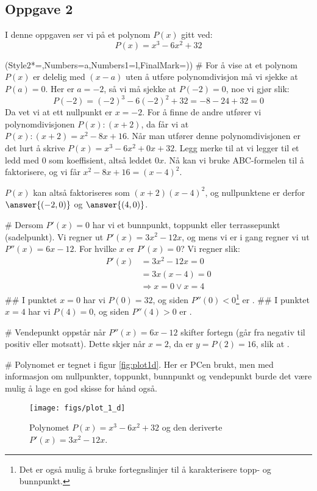 \subsection*{Oppgave 2}
I denne oppgaven ser vi på et polynom $P(x)$ gitt ved:
\begin{equation*}
	P(x) = x^3 - 6x^2 + 32
\end{equation*}
\begin{easylist}[enumerate]
	\ListProperties(Style2*=,Numbers=a,Numbers1=l,FinalMark={)})
	# For å vise at et polynom $P(x)$ er delelig med $(x-a)$ uten å utføre polynomdivisjon må vi sjekke at $P(a) = 0$. Her er $a = -2$, så vi må sjekke at $P(-2) = 0$, noe vi gjør slik: 
	\begin{equation*}
		P(-2) = (-2)^3 - 6(-2)^2 + 32 = -8 - 24 + 32 = 0
	\end{equation*}
	Da vet vi at ett nullpunkt er $x = -2$. For å finne de andre utfører vi polynomdivisjonen $P(x):(x+2)$, da får vi at $P(x):(x+2) = x^2 -8x +16$. Når man utfører denne polynomdivisjonen er det lurt å skrive $P(x) = x^3 - 6x^2 + 0x + 32$. Legg merke til at vi legger til et ledd med $0$ som koeffisient, altså leddet $0x$. Nå kan vi bruke ABC-formelen til å faktorisere, og vi får $x^2 -8x +16 = (x-4)^2$.
	
	$P(x)$ kan altså faktoriseres som $(x+2)(x-4)^2$, og nullpunktene er derfor $\answer{(-2, 0)}$ og $\answer{(4, 0)}$.
	
	# Dersom $P'(x) = 0$ har vi et bunnpunkt, toppunkt eller terrassepunkt (sadelpunkt). Vi regner ut $P'(x) = 3x^2- 12x$, og mens vi er i gang regner vi ut $P''(x) = 6x - 12$. For hvilke $x$ er $P'(x) = 0$? Vi regner slik:
	\begin{align*}
		P'(x) &= 3x^2- 12x = 0 \\
		&= 3x(x-4) = 0 \\
		&\Rightarrow x = 0 \vee x = 4
	\end{align*}
	## I punktet $x=0$ har vi $P(0) = 32$, og siden $P''(0) < 0$\footnote{Det er også mulig å bruke fortegnslinjer til å karakterisere topp- og bunnpunkt.} er .
	## I punktet $x=4$ har vi $P(4) = 0$, og siden $P''(4) > 0$ er .
	
	# Vendepunkt oppstår når $P''(x) = 6x - 12$ skifter fortegn (går fra negativ til positiv eller motsatt). Dette skjer når $x = 2$, da er $y = P(2) = 16$, slik at .
	
	# Polynomet er tegnet i figur \eqref{fig:plot1d}. Her er PCen brukt, men med informasjon om nullpunkter, toppunkt, bunnpunkt og vendepunkt burde det være mulig å lage en god skisse for hånd også.
\begin{figure}[th!]
	\centering
	\texttt{[image: figs/plot\_1\_d]}
	\caption{Polynomet $P(x) = x^3 - 6x^2 + 32$ og den deriverte $P'(x) = 3x^2- 12x$.}
	\label{fig:plot1d}
\end{figure}
\end{easylist}

